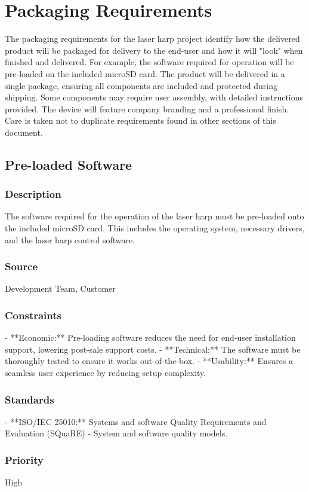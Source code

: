 \section{Packaging Requirements}

The packaging requirements for the laser harp project identify how the delivered product will be packaged for delivery to the end-user and how it will "look" when finished and delivered. For example, the software required for operation will be pre-loaded on the included microSD card. The product will be delivered in a single package, ensuring all components are included and protected during shipping. Some components may require user assembly, with detailed instructions provided. The device will feature company branding and a professional finish. Care is taken not to duplicate requirements found in other sections of this document.

\subsection{Pre-loaded Software}
\subsubsection{Description}
The software required for the operation of the laser harp must be pre-loaded onto the included microSD card. This includes the operating system, necessary drivers, and the laser harp control software.
\subsubsection{Source}
Development Team, Customer
\subsubsection{Constraints}
- **Economic:** Pre-loading software reduces the need for end-user installation support, lowering post-sale support costs.
- **Technical:** The software must be thoroughly tested to ensure it works out-of-the-box.
- **Usability:** Ensures a seamless user experience by reducing setup complexity.
\subsubsection{Standards}
- **ISO/IEC 25010:** Systems and software Quality Requirements and Evaluation (SQuaRE) - System and software quality models.
\subsubsection{Priority}
High


